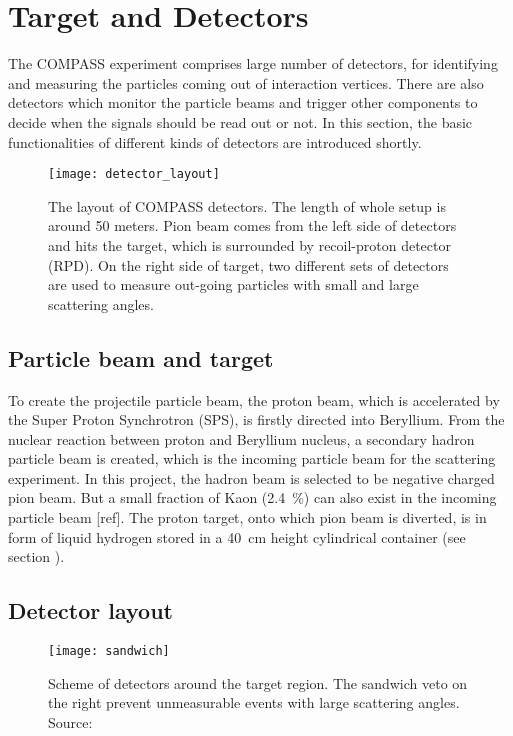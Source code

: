 \section{Target and Detectors}
The COMPASS experiment comprises large number of detectors, for identifying and measuring the particles coming out of interaction vertices. There are also detectors which monitor the particle beams and trigger other components to decide when the signals should be read out or not. In this section, the basic functionalities of different kinds of detectors are introduced shortly. 

\begin{figure*}[!ht]
	\centering
	\texttt{[image: detector\_layout]}
	\caption{The layout of COMPASS detectors. The length of whole setup is around 50 meters. Pion beam comes from the left side of detectors and hits the target, which is surrounded by recoil-proton detector (RPD). On the right side of target, two different sets of detectors are used to measure out-going particles with small and large scattering angles.}
	\label{fig:detec_layout}	
\end{figure*}

\subsection{Particle beam and target}
To create the projectile particle beam, the proton beam, which is accelerated by the Super Proton Synchrotron (SPS), is firstly directed into Beryllium. From the nuclear reaction between proton and Beryllium nucleus, a secondary hadron particle beam is created, which is the incoming particle beam for the scattering experiment. In this project, the hadron beam is selected to be negative charged pion beam. But a small fraction of Kaon (\SI{2.4}{\percent}) can also exist in the incoming particle beam [ref]. The proton target, onto which pion beam is diverted, is in form of liquid hydrogen stored in a \SI{40}{\centi\meter} height cylindrical container (see section ). 

\subsection{Detector layout}
\label{subsec:Detector_layout}
\begin{figure}[!th]
	\centering
	\texttt{[image: sandwich]}
	\caption{Scheme of detectors around the target region. The sandwich veto on the right prevent unmeasurable events with large scattering angles. Source: \cite{sandwich}}
	\label{fig:sandwich}
\end{figure}

